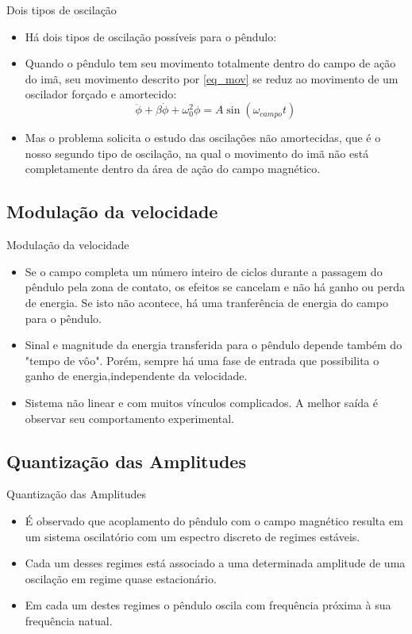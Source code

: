 \documentclass{beamer}
\begin{document}
\begin{frame}{Dois tipos de oscilação}
\begin{itemize}
\item Há dois tipos de oscilação possíveis para o pêndulo:
\item Quando o pêndulo tem seu movimento totalmente dentro do campo de ação do imã, seu movimento descrito por \eqref{eq_mov} se reduz ao movimento de um oscilador forçado e amortecido: $$ \ddot{\phi} + \beta \dot{\phi} + \omega_0^2 \phi = A \sin(\omega_{campo} t) $$
\item Mas o problema solicita o estudo das oscilações não amortecidas, que é o nosso segundo tipo de oscilação, na qual o movimento do imã não está completamente dentro da área de ação do campo magnético.
\end{itemize}
\end{frame}

\subsection{Modulação da velocidade}
\begin{frame}{Modulação da velocidade}
\begin{itemize}
\item Se o campo completa um número inteiro de ciclos durante a passagem do pêndulo pela zona de contato, os efeitos se cancelam e não há ganho ou perda de energia. Se isto não acontece, há uma tranferência de energia do campo para o pêndulo.
\item Sinal e magnitude da energia transferida para o pêndulo depende também do "tempo de vôo". Porém, sempre há uma fase de entrada que possibilita o ganho de energia,independente da velocidade.
\item Sistema não linear e com muitos vínculos complicados. A melhor saída é observar seu comportamento experimental.
\end{itemize}
\end{frame}

\subsection{Quantização das Amplitudes}
\begin{frame}{Quantização das Amplitudes}
\begin{itemize}
\item É observado que acoplamento do pêndulo com o campo magnético resulta em um sistema oscilatório com um espectro discreto de regimes estáveis.
\item Cada um desses regimes está associado a uma determinada amplitude de uma oscilação em regime quase estacionário.
\item Em cada um destes regimes o pêndulo oscila com frequência próxima à sua frequência natual.
\end{itemize}
\end{frame}
\end{document}
